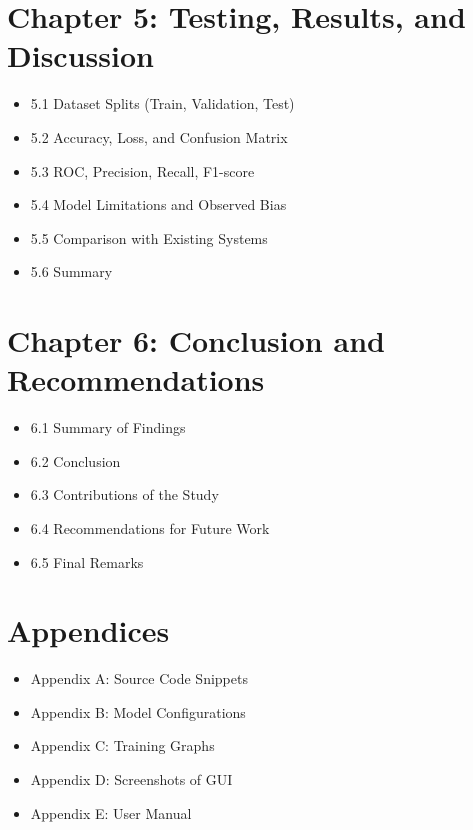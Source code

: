 \documentclass[
  12pt,
  oneside]{article}
\providecommand{\tightlist}{%
  \setlength{\itemsep}{0pt}\setlength{\parskip}{0pt}}
\begin{document}
\newpage

\section{Chapter 5: Testing, Results, and
Discussion}\label{chapter-5-testing-results-and-discussion}

\begin{itemize}
\tightlist
\item
  5.1 Dataset Splits (Train, Validation, Test)
\item
  5.2 Accuracy, Loss, and Confusion Matrix
\item
  5.3 ROC, Precision, Recall, F1-score
\item
  5.4 Model Limitations and Observed Bias
\item
  5.5 Comparison with Existing Systems
\item
  5.6 Summary
\end{itemize}

\newpage

\section{Chapter 6: Conclusion and
Recommendations}\label{chapter-6-conclusion-and-recommendations}

\begin{itemize}
\tightlist
\item
  6.1 Summary of Findings
\item
  6.2 Conclusion
\item
  6.3 Contributions of the Study
\item
  6.4 Recommendations for Future Work
\item
  6.5 Final Remarks
\end{itemize}

\newpage

\section{Appendices}\label{appendices}

\begin{itemize}
\tightlist
\item
  Appendix A: Source Code Snippets
\item
  Appendix B: Model Configurations
\item
  Appendix C: Training Graphs
\item
  Appendix D: Screenshots of GUI
\item
  Appendix E: User Manual
\end{itemize}
\end{document}
